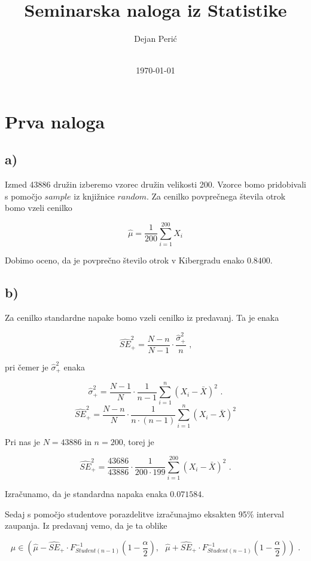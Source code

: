 \documentclass[12pt, a4paper]{article}
\title{Seminarska naloga iz Statistike}
\author{Dejan Perić \\~ \\ }
\date{\today}
\begin{document}

\maketitle




\section*{Prva naloga}

\subsection*{a)}

Izmed 43886 družin izberemo vzorec družin velikosti 200. Vzorce bomo pridobivali s pomočjo $sample$ iz knjižnice $random$. Za cenilko povprečnega števila otrok bomo vzeli cenilko

$$\hat{\mu} = \frac{1}{200}\sum^{200}_{i=1} X_i $$

Dobimo oceno, da je povprečno število otrok v Kibergradu enako $0.8400$.

\subsection*{b)}

Za cenilko standardne napake bomo vzeli cenilko iz predavanj. Ta je enaka 

$$ \widehat{SE}_+^2 = \frac{N-n}{N-1} \cdot \frac{\hat{\sigma}_+^2}{n} \text{ ,}$$

pri čemer je $\hat{\sigma}_+^2$ enaka 

$$\hat{\sigma}_+^2 = \frac{N-1}{N} \cdot \frac{1}{n-1} \sum_{i=1}^{n} (X_i - \bar{X})^2 \text{ .} $$ 
$$
\widehat{SE}_+^2 = \frac{N-n}{N} \cdot \frac{1}{n\cdot(n-1)} \sum_{i=1}^{n} (X_i - \bar{X})^2
$$

Pri nas je $ N = 43886 $ in $ n = 200 $, torej je

$$ \widehat{SE}_+^2 = \frac{43686}{43886} \cdot \frac{1}{200\cdot199} \sum_{i=1}^{200} (X_i - \bar{X})^2 \text{ .}
$$

Izračunamo, da je standardna napaka enaka $ 0.071584 $.

Sedaj s pomočjo studentove porazdelitve izračunajmo eksakten 95\% interval zaupanja.
Iz predavanj vemo, da je ta oblike

$$ \mu \in (\hat{\mu} - \widehat{SE}_+ \cdot F^{-1}_{Student(n-1)}(1-\frac{\alpha}{2}), \text{ }\hat{\mu} + \widehat{SE}_+ \cdot F^{-1}_{Student(n-1)}(1-\frac{\alpha}{2}) ) \text{ .}
$$
\end{document}
